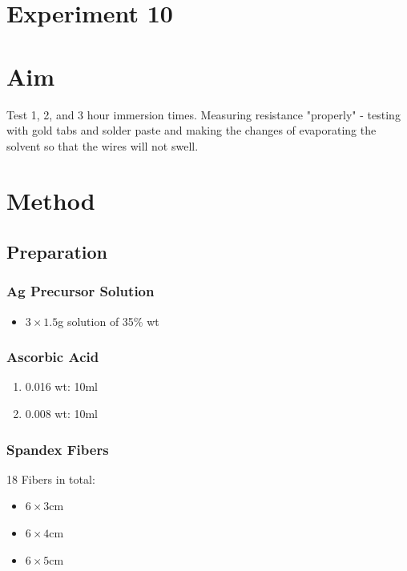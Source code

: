 \documentclass{article}
\begin{document}
\section*{Experiment 10}

\section{Aim}
Test 1, 2, and 3 hour immersion times. Measuring resistance "properly" - testing with gold tabs and solder paste and making the changes of evaporating the solvent so that the wires will not swell.

\section{Method}
\subsection{Preparation}
\subsubsection{Ag Precursor Solution}
\begin{itemize}
    \item  $3 \times 1.5$g solution of  35\% wt
\end{itemize}

\subsubsection{Ascorbic Acid}
\begin{enumerate}
    \item 0.016 wt: 10ml
    \item 0.008 wt: 10ml
\end{enumerate}

\subsubsection{Spandex Fibers}
18 Fibers in total:
\begin{itemize}
    \item $6\times 3$cm
    \item $6\times 4$cm
    \item $6\times 5$cm
\end{itemize}
\end{document}
